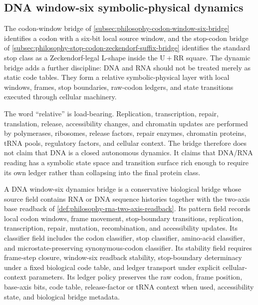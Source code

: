 \subsection{DNA window-six symbolic-physical dynamics}
\label{subsec:philosophy-dna-window-six-dynamics-bridge}

The codon-window bridge of
\autoref{subsec:philosophy-codon-window-six-bridge} identifies a codon
with a six-bit local source window, and the stop-codon bridge of
\autoref{subsec:philosophy-stop-codon-zeckendorf-suffix-bridge}
identifies the standard stop class as a Zeckendorf-legal L-shape inside
the $\mathrm{U}+\mathrm{RR}$ square. The dynamic bridge adds a further
discipline: DNA and RNA should not be treated merely as static code
tables. They form a relative symbolic-physical layer with local windows,
frames, stop boundaries, raw-codon ledgers, and state transitions
executed through cellular machinery.

The word ``relative'' is load-bearing. Replication, transcription,
repair, translation, release, accessibility changes, and chromatin
updates are performed by polymerases, ribosomes, release factors, repair
enzymes, chromatin proteins, tRNA pools, regulatory factors, and
cellular context. The bridge therefore does not claim that DNA is a
closed autonomous dynamics. It claims that DNA/RNA reading has a
symbolic state space and transition surface rich enough to require its
own ledger rather than collapsing into the final protein class.

\begin{definition}
\label{def:philosophy-dna-window-six-dynamics-bridge}
A DNA window-six dynamics bridge is a conservative biological bridge
whose source field contains RNA or DNA sequence histories together with
the two-axis base readback of
\autoref{def:philosophy-rna-two-axis-readback}. Its pattern field
records local codon windows, frame movement, stop-boundary transitions,
replication, transcription, repair, mutation, recombination, and
accessibility updates. Its classifier field includes the codon
classifier, stop classifier, amino-acid classifier, and
microstate-preserving synonymous-codon classifier. Its stability field
requires frame-step closure, window-six readback stability,
stop-boundary determinacy under a fixed biological code table, and
ledger transport under explicit cellular-context parameters. Its ledger
policy preserves the raw codon, frame position, base-axis bits, code
table, release-factor or tRNA context when used, accessibility state,
and biological bridge metadata.
\end{definition}

